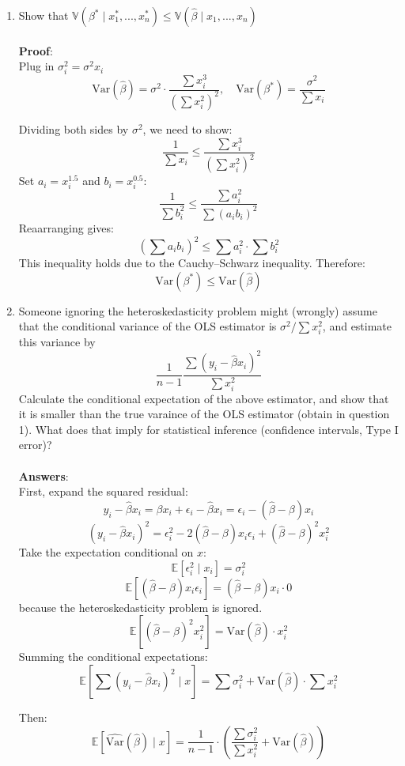\documentclass{article}
\begin{document}
\begin{flushleft}
\begin{enumerate}
\item Show that $\mathbb{V}(\beta^*\mid x_1^*,...,x_n^*)\leq \mathbb{V}(\hat{\beta} \mid x_1,...,x_n)$ \\~\\

\textbf{Proof}: \\
Plug in $\sigma_i^2=\sigma^2 x_i$
\[
\text{Var}(\hat{\beta}) = \sigma^2 \cdot \frac{\sum x_i^3}{\left( \sum x_i^2 \right)^2}, \quad
\text{Var}(\beta^*) = \frac{\sigma^2}{\sum x_i}
\]

Dividing both sides by $\sigma^2$, we need to show:
\[
\frac{1}{\sum x_i} \leq \frac{\sum x_i^3}{\left( \sum x_i^2 \right)^2}
\]
Set $a_i = x_i^{1.5}$ and $b_i = x_i^{0.5}$:
\[
\frac{1}{\sum b_i^2} \leq \frac{\sum a_i^2}{ \sum (a_i b_i)^2}
\]
Reaarranging gives:
\[
\left( \sum a_i b_i \right)^2\leq \sum a_i^2 \cdot \sum b_i^2
\]
This inequality holds due to the Cauchy–Schwarz inequality. Therefore:
\[
\text{Var}(\beta^*) \leq \text{Var}(\hat{\beta})
\]

\item Someone ignoring the heteroskedasticity problem might (wrongly) assume that the conditional variance of the OLS estimator is $\sigma^2/\sum x_i^2$, and estimate this variance by
\[
\frac{1}{n-1} \frac{\sum (y_i - \hat{\beta} x_i)^2}{\sum x_i^2}
\]
Calculate the conditional expectation of the above estimator, and show that it is smaller than the true varaince of the OLS estimator (obtain in question 1). What does that imply for statistical inference (confidence intervals, Type I error)?\\~\\
\textbf{Answers}:\\
First, expand the squared residual:
\[
y_i - \hat{\beta} x_i = \beta x_i+\epsilon_i -\hat{\beta}x_i = \epsilon_i- (\hat{\beta} - \beta) x_i
\]
\[
(y_i - \hat{\beta} x_i)^2 = \epsilon_i^2 - 2(\hat{\beta} - \beta)x_i \epsilon_i + (\hat{\beta} - \beta)^2 x_i^2
\]
Take the expectation conditional on $x$:
\[
\mathbb{E}[\epsilon_i^2 \mid x_i ]= \sigma_i^2
\]
\[
\mathbb{E}[(\hat{\beta} - \beta)x_i \epsilon_i] = (\hat{\beta} - \beta) x_i \cdot 0
\]because the heteroskedasticity problem is ignored.
\[
\mathbb{E}[(\hat{\beta} - \beta)^2 x_i^2] = \text{Var}(\hat{\beta}) \cdot x_i^2
\]
Summing the conditional expectations:
\[
\mathbb{E}[\sum (y_i - \hat{\beta} x_i)^2 \mid x] = \sum \sigma_i^2 + \text{Var}(\hat{\beta}) \cdot \sum x_i^2
\]

Then:
\[
\mathbb{E}[\widehat{\text{Var}}(\hat{\beta}) \mid x] 
= \frac{1}{n - 1} \cdot \left( \frac{\sum \sigma_i^2}{\sum x_i^2} + \text{Var}(\hat{\beta}) \right)
\]


\end{enumerate}
\end{flushleft}
\end{document}
